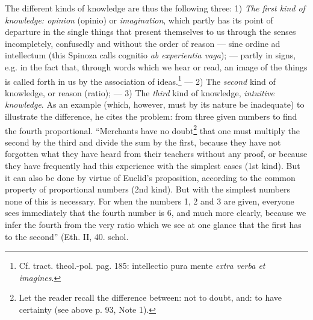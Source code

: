 \documentclass[12pt,a4paper,openany]{book}
\begin{document}
The different kinds of knowledge are thus the following three: 1)
\emph{The first kind of knowledge: opinion} (opinio) or
\emph{imagination}, which partly has its point of departure in the single
things that present themselves to us through the senses incompletely,
confusedly and without the order of reason --- sine ordine ad intellectum
(this Spinoza calls cognitio \emph{ab experientia vaga}); --- partly in
signs, e.g. in the fact that, through words which we hear or
read, an image of the things is called forth in us by the association of
ideas.\footnote{Cf. tract. theol.-pol. pag. 185: intellectio
pura mente \emph{extra verba et imagines}.} --- 2) The \emph{second}
kind of knowledge, or reason (ratio); --- 3) The \emph{third}
kind of knowledge, \emph{intuitive knowledge}. As an example (which, however,
must by its nature be inadequate) to illustrate the difference, he cites
the problem: from three given numbers to find the fourth proportional.
``Merchants have no doubt\footnote{Let the reader recall the difference
between: not to doubt, and: to have certainty (see above p. 93, Note
1).} that one must multiply the second by the third and divide
the sum by the first, because they have not forgotten what they have heard
from their teachers without any proof, or because they have frequently had
this experience with the simplest cases (1st kind). But it can
also be done by virtue of Euclid's proposition, according to the common
property of proportional numbers (2nd kind). But with the simplest numbers none of
this is necessary. For when the numbers 1, 2 and 3 are given, everyone
sees immediately that the fourth number is 6, and much more clearly,
because we infer the fourth from the very ratio which we see
at one glance that the first has to the second'' (Eth. II, 40. schol.
\end{document}
